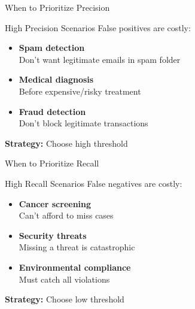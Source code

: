 \documentclass{beamer}
\begin{document}
\begin{frame}{When to Prioritize Precision}
\begin{examplebox}{High Precision Scenarios}
False positives are costly:
\end{examplebox}

\vspace{0.3cm}

\begin{itemize}
    \item \textbf{Spam detection} \\
          Don't want legitimate emails in spam folder

    \item \textbf{Medical diagnosis} \\
          Before expensive/risky treatment

    \item \textbf{Fraud detection} \\
          Don't block legitimate transactions
\end{itemize}

\vspace{0.3cm}

\begin{center}
\textbf{Strategy:} Choose high threshold
\end{center}
\end{frame}

\begin{frame}{When to Prioritize Recall}
\begin{examplebox}{High Recall Scenarios}
False negatives are costly:
\end{examplebox}

\vspace{0.3cm}

\begin{itemize}
    \item \textbf{Cancer screening} \\
          Can't afford to miss cases

    \item \textbf{Security threats} \\
          Missing a threat is catastrophic

    \item \textbf{Environmental compliance} \\
          Must catch all violations
\end{itemize}

\vspace{0.3cm}

\begin{center}
\textbf{Strategy:} Choose low threshold
\end{center}
\end{frame}
\end{document}
